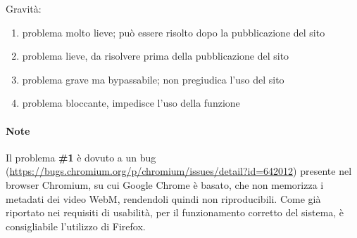 Gravità:
	\begin{enumerate}
		\item problema molto lieve; può essere risolto dopo la pubblicazione 
		del sito
		\item problema lieve, da risolvere prima della pubblicazione del sito
		\item problema grave ma bypassabile; non pregiudica l'uso del sito
		\item problema bloccante, impedisce l'uso della funzione
	\end{enumerate}

\paragraph{Note} Il problema \textbf{\#1} è dovuto a un bug 
(\url{https://bugs.chromium.org/p/chromium/issues/detail?id=642012}) presente 
nel 
browser Chromium, su cui Google Chrome è basato, che non memorizza i metadati 
dei video WebM, rendendoli quindi non riproducibili. Come 
già riportato nei requisiti di usabilità, per il funzionamento corretto del 
sistema, è consigliabile l'utilizzo di Firefox.